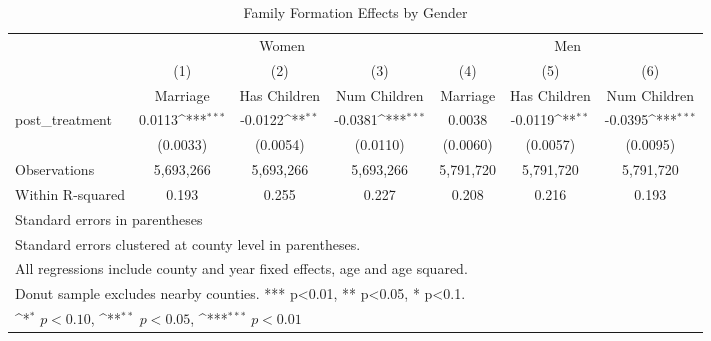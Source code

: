 \begin{table}[htbp]\centering
\def\sym#1{\ifmmode^{#1}\else\(^{#1}\)\fi}
\caption{Family Formation Effects by Gender}
\begin{tabular}{l*{6}{c}}
\hline\hline
            &\multicolumn{3}{c}{Women}                                        &\multicolumn{3}{c}{Men}                                          \\\cmidrule(lr){2-4}\cmidrule(lr){5-7}
            &\multicolumn{1}{c}{(1)}&\multicolumn{1}{c}{(2)}&\multicolumn{1}{c}{(3)}&\multicolumn{1}{c}{(4)}&\multicolumn{1}{c}{(5)}&\multicolumn{1}{c}{(6)}\\
            &\multicolumn{1}{c}{Marriage}&\multicolumn{1}{c}{Has Children}&\multicolumn{1}{c}{Num Children}&\multicolumn{1}{c}{Marriage}&\multicolumn{1}{c}{Has Children}&\multicolumn{1}{c}{Num Children}\\
\hline
post\_treatment&      0.0113\sym{***}&     -0.0122\sym{**} &     -0.0381\sym{***}&      0.0038         &     -0.0119\sym{**} &     -0.0395\sym{***}\\
            &    (0.0033)         &    (0.0054)         &    (0.0110)         &    (0.0060)         &    (0.0057)         &    (0.0095)         \\
\hline
Observations&   5,693,266         &   5,693,266         &   5,693,266         &   5,791,720         &   5,791,720         &   5,791,720         \\
Within R-squared&       0.193         &       0.255         &       0.227         &       0.208         &       0.216         &       0.193         \\
\hline\hline
\multicolumn{7}{l}{\footnotesize Standard errors in parentheses}\\
\multicolumn{7}{l}{\footnotesize Standard errors clustered at county level in parentheses.}\\
\multicolumn{7}{l}{\footnotesize All regressions include county and year fixed effects, age and age squared.}\\
\multicolumn{7}{l}{\footnotesize Donut sample excludes nearby counties. *** p<0.01, ** p<0.05, * p<0.1.}\\
\multicolumn{7}{l}{\footnotesize \sym{*} \(p<0.10\), \sym{**} \(p<0.05\), \sym{***} \(p<0.01\)}\\
\end{tabular}
\end{table}
